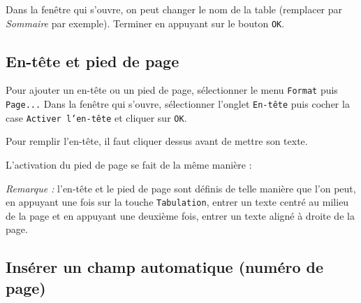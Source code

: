 
Dans la fenêtre qui s'ouvre, on peut changer le nom de la table (remplacer par \emph{Sommaire} par exemple). Terminer en appuyant sur le bouton \texttt{OK}.




\subsection{En-tête et pied de page}\label{Texte3entetePied}

Pour ajouter un en-tête ou un pied de page, sélectionner le menu \texttt{Format} puis \texttt{Page...} Dans la fenêtre qui s'ouvre, sélectionner l'onglet \texttt{En-tête} puis cocher la case \texttt{Activer l'en-tête} et cliquer sur \texttt{OK}.


Pour remplir l'en-tête, il faut cliquer dessus avant de mettre son texte.


L'activation du pied de page se fait de la même manière :



\emph{Remarque :} l'en-tête et le pied de page sont définis de telle manière que l'on peut, en appuyant une fois sur la touche \texttt{Tabulation}, entrer un texte centré au milieu de la page et en appuyant une deuxième fois, entrer un texte aligné à droite de la page.



\subsection{Insérer un champ automatique (numéro de page)}\label{Texte3champAuto}

